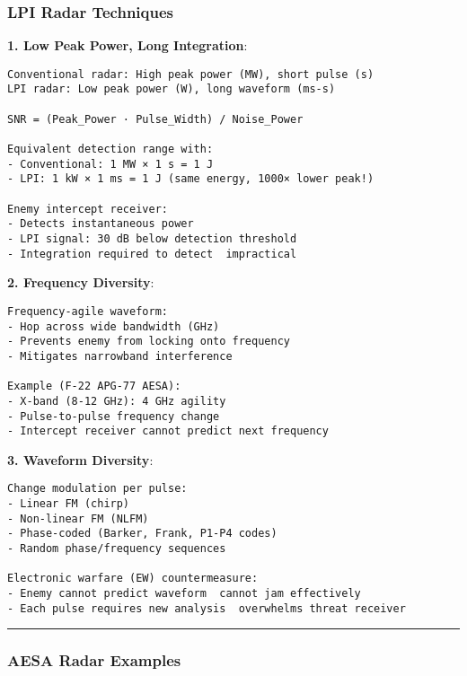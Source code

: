 \subsubsection{LPI Radar Techniques}\label{lpi-radar-techniques}

\textbf{1. Low Peak Power, Long Integration}:

\begin{verbatim}
Conventional radar: High peak power (MW), short pulse (s)
LPI radar: Low peak power (W), long waveform (ms-s)

SNR = (Peak_Power · Pulse_Width) / Noise_Power

Equivalent detection range with:
- Conventional: 1 MW × 1 s = 1 J
- LPI: 1 kW × 1 ms = 1 J (same energy, 1000× lower peak!)

Enemy intercept receiver:
- Detects instantaneous power
- LPI signal: 30 dB below detection threshold
- Integration required to detect  impractical
\end{verbatim}

\textbf{2. Frequency Diversity}:

\begin{verbatim}
Frequency-agile waveform:
- Hop across wide bandwidth (GHz)
- Prevents enemy from locking onto frequency
- Mitigates narrowband interference

Example (F-22 APG-77 AESA):
- X-band (8-12 GHz): 4 GHz agility
- Pulse-to-pulse frequency change
- Intercept receiver cannot predict next frequency
\end{verbatim}

\textbf{3. Waveform Diversity}:

\begin{verbatim}
Change modulation per pulse:
- Linear FM (chirp)
- Non-linear FM (NLFM)
- Phase-coded (Barker, Frank, P1-P4 codes)
- Random phase/frequency sequences

Electronic warfare (EW) countermeasure:
- Enemy cannot predict waveform  cannot jam effectively
- Each pulse requires new analysis  overwhelms threat receiver
\end{verbatim}

\begin{center}\rule{0.5\linewidth}{0.5pt}\end{center}

\subsubsection{AESA Radar Examples}\label{aesa-radar-examples}


